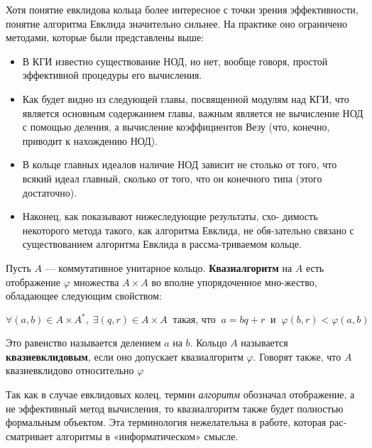 Хотя понятие евклидова кольца более интересное с точки зрения
эффективности, понятие алгоритма Евклида значительно сильнее. На
практике оно ограничено методами, которые были представлены выше:
\begin{itemize}


\item В КГИ известно существование НОД, но нет, вообще говоря, простой эффективной процедуры его вычисления.

\item Как будет видно из следующей главы, посвященной модулям над
КГИ, что является основным содержанием главы, важным явля­ется не вычисление НОД с помощью деления, а вычисление коэф­фициентов Везу (что, конечно, приводит к нахождению НОД).

\item В кольце главных идеалов наличие НОД зависит не столько от то­го, что всякий идеал главный, сколько от того, что он конечного
типа (этого достаточно).
\newpage
\item Наконец, как показывают нижеследующие результаты, схо-\linebreak
ди­мость некоторого метода такого, как алгоритма Евклида, не обя-\linebreak зательно связано с существованием алгоритма Евклида в рассма-\linebreak триваемом кольце.
\end{itemize}
\begin{determ}
\hspace*{0.5cm}
Пусть $A$ — коммутативное унитарное кольцо. \textbf{Квазиалгоритм} на\linebreak
$A$ есть отображение $\varphi$ множества $A\times A$ во вполне упорядоченное мно-\linebreak жество, обладающее следующим свойством:
\begin{center}
$\forall(a,b)\in A\times A^*,\; \exists(q,r)\in A\times A\;\;\text{такая, что}\;\;a = bq + r\;\;\text{и}\;\;\varphi(b,r)<\varphi(a,b)$
\end{center}
Это равенство называется делением $a$ на $b$. Кольцо $A$\linebreak
называется \textbf{квазиевклидовым}, если оно допускает квазиалгоритм $\varphi$.\linebreak
Говорят также, что $A$ квазиевклидово относительно $\varphi$
\end{determ}
\begin{mynote}
Так как в случае евклидовых колец, термин \textit{алгоритм}\linebreak
обозначал отображение, а не эффективный метод вычисления,\linebreak
то квазиалгоритм также будет полностью формальным\linebreak
объектом. Эта терминология нежелательна в работе, которая\linebreak
рас­сматривает алгоритмы в «информатическом» смысле.
\end{mynote}
